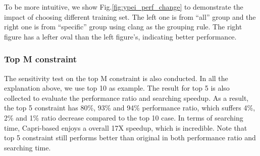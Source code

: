     To be more intuitive, we show Fig.\ref{fig:ypei_perf_change} to demonstrate
    the impact of choosing different training set. The left one is from
    ``all'' group and the right one is from ``specific'' group using clang as
    the grouping rule. The right figure has a lefter oval than the left figure's, indicating better performance.

    \subsubsection{Top M constraint}
    \label{sec:top_m}
    The sensitivity test on the top M constraint is also conducted. In all the
    explanation above, we use top 10 as example. The result for top 5 is
    also collected to evaluate the performance ratio and searching speedup.
    As a result, the top 5 constraint has 80\%, 93\% and 94\% performance ratio,
    which suffers 4\%, 2\% and 1\% ratio decrease compared to the top 10 case.
    In terms of searching time,
    Capri-based \atl enjoys a overall 17X speedup, which is incredible. Note
    that top 5 constraint still performs better than original \atl in both
    performance ratio and searching time.
